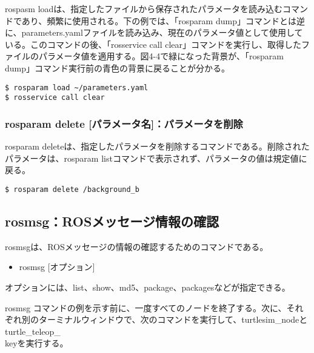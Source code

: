 rospasm loadは、指定したファイルから保存されたパラメータを読み込むコマンドであり、頻繁に使用される。下の例では、「rosparam dump」コマンドとは逆に、parameters.yamlファイルを読み込み、現在のパラメータ値として使用している。このコマンドの後、「rosservice call clear」コマンドを実行し、取得したファイルのパラメータ値を適用する。図4-4で緑になった背景が、「rosparam dump」コマンド実行前の青色の背景に戻ることが分かる。

\begin{lstlisting}[language=ROS]
$ rosparam load ~/parameters.yaml
$ rosservice call clear
\end{lstlisting}

\subsubsection{rosparam delete [パラメータ名]：パラメータを削除}

rosparam deleteは、指定したパラメータを削除するコマンドである。削除されたパラメータは、rosparam listコマンドで表示されず、パラメータの値は規定値に戻る。

\begin{lstlisting}[language=ROS]
$ rosparam delete /background_b
\end{lstlisting}

\subsection{rosmsg：ROSメッセージ情報の確認}

\vspace{\baselineskip}
rosmsgは、ROSメッセージの情報の確認するためのコマンドである。
\vspace{\baselineskip}

\begin{itemize}
\item   rosmsg [オプション]
\end{itemize}

オプションには、list、show、md5、package、packagesなどが指定できる。

rosmsg コマンドの例を示す前に、一度すべてのノードを終了する。次に、それぞれ別のターミナルウィンドウで、次のコマンドを実行して、turtlesim\_nodeとturtle\_teleop\_\\keyを実行する。

